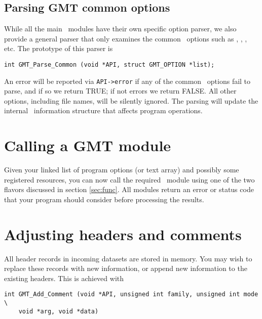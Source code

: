 \documentclass[11pt]{report}
\begin{document}
\subsection{Parsing GMT common options}

While all the main \GMT\ modules have their own specific option parser, we also provide a general
parser that only examines the common \GMT\ options such as , , , etc.  The prototype
of this parser is


\begin{verbatim}
int GMT_Parse_Common (void *API, struct GMT_OPTION *list);
\end{verbatim}

An error will be reported via \texttt{API->error} if any of the common \GMT\ options fail to parse,
and if so we return TRUE; if not errors we return FALSE.  All other options,
including file names, will be silently ignored.  The parsing will update the internal \GMT\
information structure that affects program operations.

\section{Calling a GMT module}

Given your linked list of program options (or text array) and possibly some registered resources, you
can now call the required \GMT\ module using one of the two flavors discussed in section {\ref{sec:func}}.
All modules return an error or status code that your program should consider before processing the results.

\section{Adjusting headers and comments}

All header records in incoming datasets are stored in memory.  You may wish to replace these records with
new information, or append new information to the existing headers.  This is achieved with


\begin{verbatim}
int GMT_Add_Comment (void *API, unsigned int family, unsigned int mode \
    void *arg, void *data)
\end{verbatim}
\end{document}
